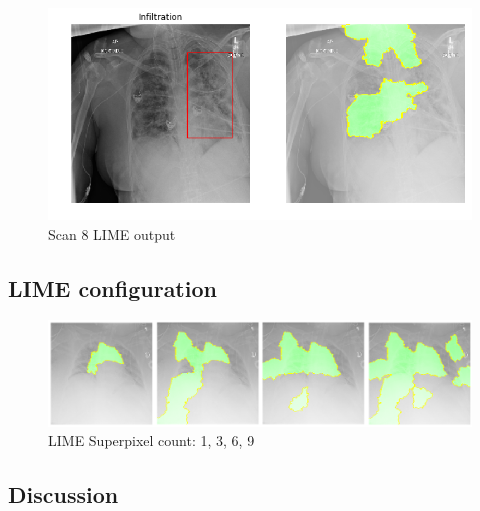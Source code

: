 \begin{figure}[H]
\centering
\caption{Scan 8 LIME output}
\includegraphics[width=12cm]{chapters/03_classification/images/lime_8.png}
\end{figure}

\subsection{LIME configuration}

\begin{figure}[H]
\centering
\caption{LIME Superpixel count: 1, 3, 6, 9}
\includegraphics[width=14cm]{chapters/03_classification/images/lime-superpixel.png}
\end{figure}

\subsection{Discussion}
